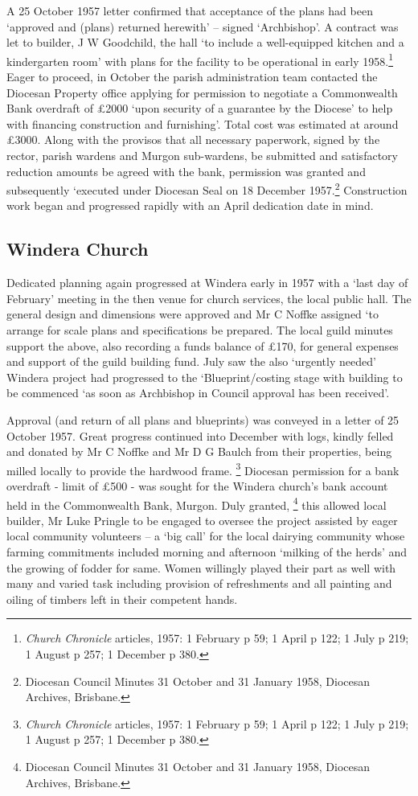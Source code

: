 A 25 October 1957 letter confirmed that acceptance of the plans had been
`approved and (plans) returned herewith' -- signed `Archbishop'. A
contract was let to builder, J W Goodchild, the hall `to include a
well-equipped kitchen and a kindergarten room' with plans for the
facility to be operational in early 1958.\footnote{\emph{Church
  Chronicle} articles, 1957: 1 February p 59; 1 April p 122; 1 July p
  219; 1 August p 257; 1 December p 380.} Eager to proceed, in October
the parish administration team contacted the Diocesan Property office
applying for permission to negotiate a Commonwealth Bank overdraft of
\pounds2000 `upon security of a guarantee by the Diocese' to help with
financing construction and furnishing'. Total cost was estimated at
around \pounds3000. Along with the provisos that all necessary paperwork,
signed by the rector, parish wardens and Murgon sub-wardens, be
submitted and satisfactory reduction amounts be agreed with the bank,
permission was granted and subsequently `executed under Diocesan Seal on
18 December 1957.\footnote{Diocesan Council Minutes 31 October and 31
  January 1958, Diocesan Archives, Brisbane.} Construction work began
and progressed rapidly with an April dedication date in mind.

\subsection{Windera Church}

Dedicated planning again progressed at Windera early in 1957 with a
`last day of February' meeting in the then venue for church services,
the local public hall. The general design and dimensions were approved
and Mr C Noffke assigned `to arrange for scale plans and specifications
be prepared. The local guild minutes support the above, also recording a
funds balance of \pounds170, for general expenses and support of the guild
building fund. July saw the also `urgently needed' Windera project had
progressed to the `Blueprint/costing stage with building to be commenced
`as soon as Archbishop in Council approval has been received'.

Approval (and return of all plans and blueprints) was conveyed in a
letter of 25 October 1957. Great progress continued into December with
logs, kindly felled and donated by Mr C Noffke and Mr D G Baulch from
their properties, being milled locally to provide the hardwood frame.
\footnote{\emph{Church Chronicle} articles, 1957: 1 February p 59; 1
  April p 122; 1 July p 219; 1 August p 257; 1 December p 380.} Diocesan
permission for a bank overdraft - limit of \pounds500 - was sought for the
Windera church's bank account held in the Commonwealth Bank, Murgon.
Duly granted, \footnote{Diocesan Council Minutes 31 October and 31
  January 1958, Diocesan Archives, Brisbane.} this allowed local
builder, Mr Luke Pringle to be engaged to oversee the project assisted
by eager local community volunteers -- a `big call' for the local
dairying community whose farming commitments included morning and
afternoon `milking of the herds' and the growing of fodder for same.
Women willingly played their part as well with many and varied task
including provision of refreshments and all painting and oiling of
timbers left in their competent hands.

